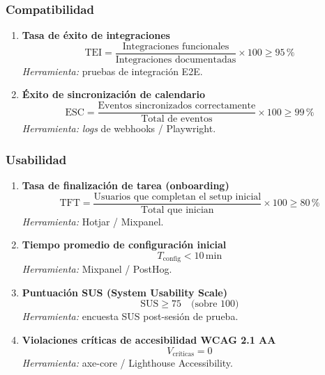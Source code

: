 \documentclass[12pt, a4paper]{article}
\begin{document}
\subsubsection*{Compatibilidad}

\begin{enumerate}[leftmargin=*, label=\textbf{KPI \arabic*.}, start=8]

    \item \textbf{Tasa de éxito de integraciones}
    \[
        \text{TEI} = \frac{\text{Integraciones funcionales}}{\text{Integraciones documentadas}} \times 100 \geq 95\,\%
    \]
    \textit{Herramienta:} pruebas de integración E2E.

    \item \textbf{Éxito de sincronización de calendario}
    \[
        \text{ESC} = \frac{\text{Eventos sincronizados correctamente}}{\text{Total de eventos}} \times 100 \geq 99\,\%
    \]
    \textit{Herramienta:} \textit{logs} de webhooks / Playwright.

\end{enumerate}

\subsubsection*{Usabilidad}

\begin{enumerate}[leftmargin=*, label=\textbf{KPI \arabic*.}, start=10]

    \item \textbf{Tasa de finalización de tarea (onboarding)}
    \[
        \text{TFT} = \frac{\text{Usuarios que completan el setup inicial}}{\text{Total que inician}} \times 100 \geq 80\,\%
    \]
    \textit{Herramienta:} Hotjar / Mixpanel.

    \item \textbf{Tiempo promedio de configuración inicial}
    \[
        T_{\text{config}} < 10\,\text{min}
    \]
    \textit{Herramienta:} Mixpanel / PostHog.

    \item \textbf{Puntuación SUS (System Usability Scale)}
    \[
        \text{SUS} \geq 75 \quad \text{(sobre 100)}
    \]
    \textit{Herramienta:} encuesta SUS post-sesión de prueba.

    \item \textbf{Violaciones críticas de accesibilidad WCAG 2.1 AA}
    \[
        V_{\text{críticas}} = 0
    \]
    \textit{Herramienta:} axe-core / Lighthouse Accessibility.

\end{enumerate}
\end{document}
